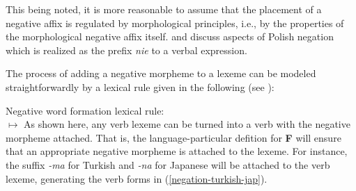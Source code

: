 \documentclass[output=paper
                ,modfonts
                ,nonflat
	        ,collection
	        ,collectionchapter
	        ,collectiontoclongg
 	        ,biblatex
                ,babelshorthands
                ,newtxmath
                ,draftmode
                ,colorlinks, citecolor=brown
]{./langsci/langscibook}
\begin{document}
{\begin{exe}
\begin{xlist}
\begin{exe}
\begin{xlist}
This being noted, it is more reasonable to assume that the placement of a
negative affix is regulated by morphological principles, i.e., by
the properties of the morphological negative affix itself.
\citet{PK:99} and \citet{Prz:00, Prz:01}
discuss aspects of Polish negation which is realized as the prefix
  {\it nie} to a verbal expression.
%

The process of adding a negative morpheme to a lexeme can be modeled
straightforwardly by a lexical rule given in the following (see \citealt{Kim:00,Crowgey:12}):

\ea
\label{lr-neg-word-formation}
Negative word formation lexical rule:\\
 $\mapsto$
\z
%
As shown here, any verb lexeme can be turned into a verb with the negative
morpheme attached. That is, the language-particular defition for
\textbf{F} will ensure that an appropriate
negative morpheme is attached to the lexeme. For instance, the
suffix {\it -ma} for Turkish
and {\it -na} for Japanese will be attached to the verb lexeme, generating
the verb forms in (\ref{negation-turkish-jap}).




\end{xlist}
\end{exe}
\end{xlist}
\end{exe}}
\end{document}
